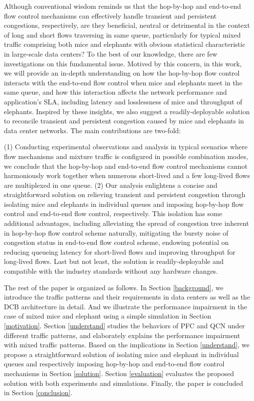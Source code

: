 \documentclass[]{sig-alternate-10pt}
\begin{document}
Although conventional wisdom reminds us that the hop-by-hop and end-to-end flow control mechanisms can effectively handle transient and persistent congestions, respectively, are they beneficial, neutral or detrimental in the context of long and short flows traversing in same queue, particularly for typical mixed traffic comprising both mice and elephants with obvious statistical characteristic in large-scale data centers? To the best of our knowledge, there are few investigations on this fundamental issue. Motived by this concern, in this work, we will provide an in-depth understanding on how the hop-by-hop flow control interacts with the end-to-end flow control when mice and elephants meet in the same queue, and how this interaction affects the network performance and application's SLA, including latency and losslessness of mice and throughput of elephants. Inspired by these insights, we also suggest a readily-deployable solution to reconcile transient and persistent congestion caused by mice and elephants in data center networks. The main contributions are two-fold:

(1)	Conducting experimental observations and analysis in typical scenarios where flow mechanisms and mixture traffic is configured in possible combination modes, we conclude that the hop-by-hop and end-to-end flow control mechanisms cannot harmoniously work together when numerous short-lived and a few long-lived flows are multiplexed in one queue. 
(2)	Our analysis enlightens a concise and straightforward solution on relieving transient and persistent congestion through isolating mice and elephants in individual queues and imposing hop-by-hop flow control and end-to-end flow control, respectively. This isolation has some additional advantages, including alleviating the spread of congestion tree inherent in hop-by-hop flow control scheme naturally, mitigating the bursty noise of congestion status in end-to-end flow control scheme,  endowing potential on reducing queueing latency for short-lived flows and improving throughput for long-lived flows. Last but not least, the solution is readily-deployable and compatible with the industry standards without any hardware changes.

The rest of the paper is organized as follows. In Section \ref{background}, we introduce the traffic patterns and their requirements in data centers as well as the DCB architecture in detail. And we  illustrate the performance impairment in the case of mixed mice and elephant using a simple simulation in Section \ref{motivation}. Section \ref{understand} studies the behaviors of PFC and QCN under different traffic patterns, and elaborately explains the performance impairment with mixed traffic patterns. Based on the implications in Section \ref{understand}, we propose a straightforward solution of isolating mice and elephant in individual queues and respectively imposing hop-by-hop and end-to-end flow control mechanisms in Section \ref{solution}. Section \ref{evaluation} evaluates the proposed solution with both experiments and simulations. Finally, the paper is concluded in Section \ref{conclusion}.
\end{document}
